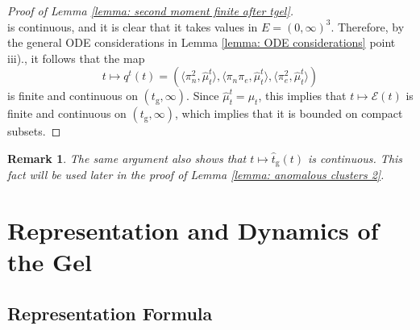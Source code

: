 \documentclass[11pt, notitlepage]{article}
\newtheorem{rmk}[thm]{Remark}
\begin{document}
\begin{proof}[Proof of Lemma \ref{lemma: second moment finite after tgel}]
\begin{equation}
\end{equation} is continuous, and it is clear that it takes values in $E=(0,\infty)^3$. Therefore, by the general ODE considerations in Lemma \ref{lemma: ODE considerations} point iii)., it follows that the map \begin{equation}
    t\mapsto q^t(t)= \left(\langle \pi_n^2, \widehat{\mu}^t_t\rangle,\langle \pi_n\pi_e, \widehat{\mu}^t_t\rangle,\langle \pi_e^2, \widehat{\mu}^t_t\rangle\right)
\end{equation} is finite and continuous on $(t_\mathrm{g}, \infty).$  Since $\widehat{\mu}^t_t=\mu_t$, this implies that $t\mapsto \mathcal{E}(t)$ is finite and continuous on $(t_\mathrm{g}, \infty)$, which implies that it is bounded on compact subsets. \end{proof}

\begin{rmk} The same argument also shows that $t\mapsto \widehat{t}_\mathrm{g}(t)$ is continuous. This fact will be used later in the proof of Lemma \ref{lemma: anomalous clusters 2}. \end{rmk}


\section{\textbf{Representation and Dynamics of the Gel}} \label{sec: gel dynamics}
\subsection{\textbf{Representation Formula}}
\end{document}
